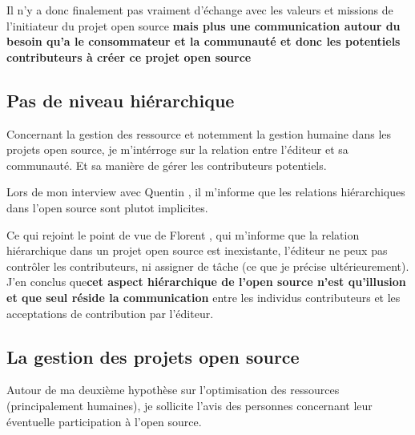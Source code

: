 			Il n'y a donc finalement pas vraiment d'échange avec les valeurs et missions de l'initiateur du projet open source \textbf{mais plus une communication autour du besoin qu'a le consommateur et la communauté et donc les potentiels contributeurs à créer ce projet open source}

		\subsection{Pas de niveau hiérarchique}

			Concernant la gestion des ressource et notemment la gestion humaine dans les projets open source, je m'intérroge sur la relation entre l'éditeur et sa communauté. Et sa manière de gérer les contributeurs potentiels.

			Lors de mon interview avec Quentin , il m'informe que les relations hiérarchiques dans l'open source sont plutot implicites.

			\begin{center}
				\textit{
				}
			\end{center}

			Ce qui rejoint le point de vue de Florent , qui m'informe que la relation hiérarchique dans un projet open source est inexistante, l'éditeur ne peux pas contrôler les contributeurs, ni assigner de tâche (ce que je précise ultérieurement).\\

			J'en conclus que\textbf{cet aspect hiérarchique de l'open source n'est qu'illusion et que seul réside la communication} entre les individus contributeurs et les acceptations de contribution par l'éditeur.

		\subsection{La gestion des projets open source}

			Autour de ma deuxième hypothèse sur l'optimisation des ressources (principalement humaines), je sollicite l'avis des personnes concernant leur éventuelle participation à l'open source.\\

